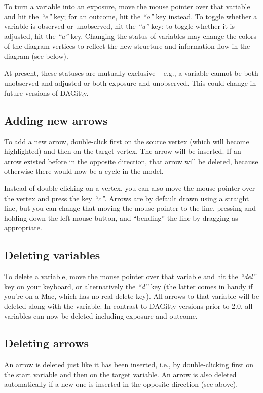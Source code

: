 \documentclass[a4paper]{article} %
\newcommand{\pp}{{\sc DAG}itty\xspace}
\newcommand{\action}[1]{\emph{``#1''}}
\begin{document}
To turn a variable into an exposure, move the
mouse pointer over that variable and hit the \action{e} key; 
for an outcome, hit the \action{o} key instead.
To toggle whether a variable is observed or unobserved,
hit the \action{u} key; to toggle whether it is 
adjusted, hit the \action{a} key.
Changing the status of variables may change the 
colors of the diagram vertices to reflect the new structure 
and information flow in the diagram (see below). 

At present, these statuses are mutually exclusive --  e.g.,
a variable cannot be both unobserved and adjusted 
or both exposure and unobserved. This could change
in future versions of \pp.

\subsection{Adding new arrows}

To add a new arrow, double-click first on the source vertex 
(which will become highlighted) and then on the target vertex.
The arrow will be inserted. If an arrow existed before
in the opposite direction, that arrow will be deleted, because otherwise
there would now be a cycle in the model. 

Instead of double-clicking on a vertex, you can also move the mouse pointer
over the vertex and press the key \action{c}. Arrows are by default
drawn using a straight line,
but you can change that moving the mouse pointer to the line,
pressing and holding down the left mouse button, and ``bending''
the line by dragging as appropriate.

\subsection{Deleting variables}

To delete a variable, move the mouse pointer over that variable 
and hit the \action{del} key on your keyboard, or alternatively
the \action{d} key (the latter comes in handy if you're on a Mac, which 
has no real delete key).
All arrows to that variable will be deleted along 
with the variable. In contrast to \pp versions prior to 2.0,
all variables can now be deleted including exposure and outcome.

\subsection{Deleting arrows}

An arrow is deleted just like it has been inserted, 
i.e., by double-clicking first on the start 
variable and then on the target variable. An arrow 
is also deleted automatically if a new one is 
inserted in the opposite direction (see above). 
\end{document}
